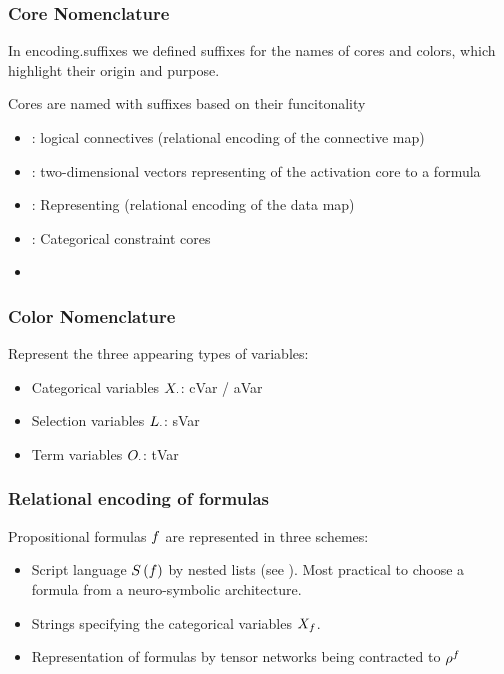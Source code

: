 \subsubsection{Core Nomenclature}

In encoding.suffixes we defined suffixes for the names of cores and colors, which highlight their origin and purpose.

Cores are named with suffixes based on their funcitonality
\begin{itemize}
	\item {}: logical connectives (relational encoding of the connective map)
	\item {}: two-dimensional vectors representing of the activation core to a formula 
	\item {}: Representing (relational encoding of the data map)
	\item {}: Categorical constraint cores 
	\item {}
\end{itemize}

\subsubsection{Color Nomenclature}

Represent the three appearing types of variables:
\begin{itemize}
	\item Categorical variables $X_{\cdot}$: cVar / aVar
	\item Selection variables $L_{\cdot}$: sVar %
	\item Term variables $O_{\cdot}$: tVar %
\end{itemize}


\subsubsection{Relational encoding of formulas}

Propositional formulas $f$ are represented in three schemes:
\begin{itemize}
	\item Script language $S\left(f\right)$ by nested lists (see ).
		Most practical to choose a formula from a neuro-symbolic architecture.
	\item Strings specifying the categorical variables $X_{f}$.
	\item Representation of formulas by tensor networks being contracted to $\rho^{f}$
\end{itemize}

